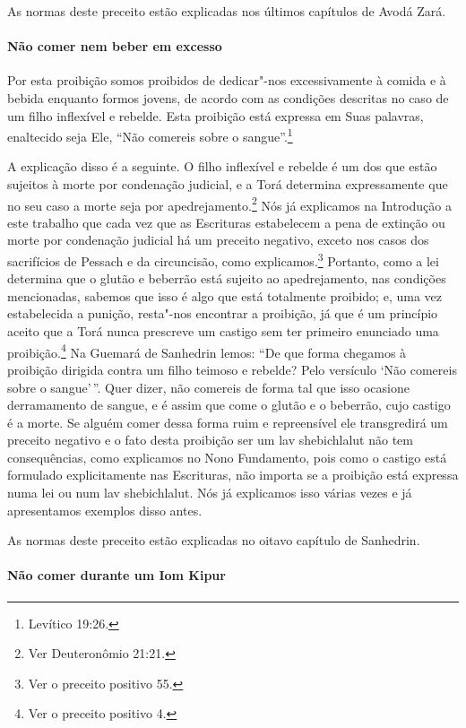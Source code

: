 \begin{multicols}{2}
As normas deste preceito estão explicadas nos últimos capítulos de Avodá Zará\starr.

\paragraph{Não comer nem beber em excesso}

Por esta proibição somos proibidos de dedicar"-nos excessivamente à
comida e à bebida enquanto formos jovens, de acordo com as condições
descritas no caso de um filho inflexível e rebelde. Esta proibição está
expressa em Suas palavras, enaltecido seja Ele, ``Não comereis sobre o
sangue''.\footnote{Levítico 19:26.}

A explicação disso é a seguinte. O filho inflexível e rebelde é um dos
que estão sujeitos à morte por condenação judicial, e a Torá\starr{} determina
expressamente que no seu caso a morte seja por
apedrejamento.\footnote{Ver Deuteronômio 21:21.} Nós já explicamos na Introdução a
este trabalho que cada vez que as Escrituras estabelecem a pena de
extinção ou morte por condenação judicial há um preceito negativo,
exceto nos casos dos sacrifícios de Pessach\starr{} e da circuncisão, como
explicamos.\footnote{Ver o preceito positivo 55.} Portanto, como a lei determina que o
glutão e beberrão está sujeito ao apedrejamento, nas condições
mencionadas, sabemos que isso é algo que está totalmente proibido; e,
uma vez estabelecida a punição, resta"-nos encontrar a proibição, já que
é um princípio aceito que a Torá\starr{} nunca prescreve um castigo sem ter
primeiro enunciado uma proibição.\footnote{Ver o preceito positivo 4.} Na Guemará\starr{} de
Sanhedrin\starr{} lemos: ``De que forma chegamos à proibição dirigida contra um
filho teimoso e rebelde? Pelo versículo `Não comereis sobre o sangue'\,''.
Quer dizer, não comereis de forma tal que isso ocasione derramamento de
sangue, e é assim que come o glutão e o beberrão, cujo castigo é a
morte. Se alguém comer dessa forma ruim e repreensível ele transgredirá
um preceito negativo e o fato desta proibição ser um lav shebichlalut\starr{} não tem consequências, como explicamos no Nono
Fundamento, pois como o castigo está formulado explicitamente nas
Escrituras, não importa se a proibição está expressa numa lei ou num
lav shebichlalut\starr. Nós já explicamos isso várias vezes e já
apresentamos exemplos disso antes.

As normas deste preceito estão explicadas no oitavo capítulo de Sanhedrin\starr.

\paragraph{Não comer durante um Iom Kipur\starr}


\end{multicols}
